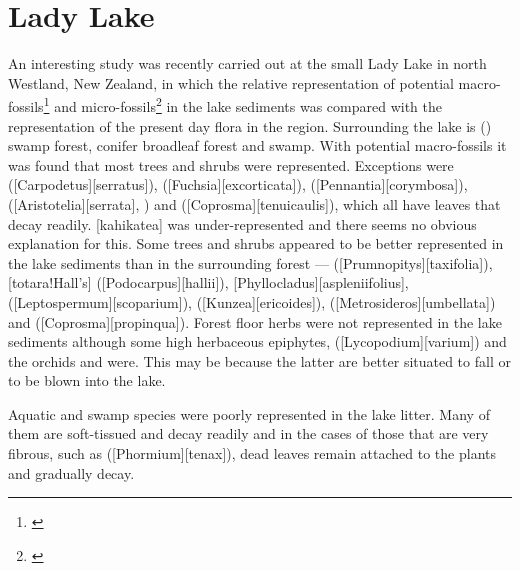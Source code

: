 \section{Lady Lake}

An interesting study was recently carried out at the small Lady Lake in north Westland, New Zealand, in which the relative representation of potential macro-fossils\footnote{\cite{drake1980influx}} and micro-fossils\footnote{\cite{pocknall1980modern}} in the lake sediments was compared with the representation of the present day flora in the region.
Surrounding the lake is  () swamp forest, conifer broadleaf forest and swamp.
With potential macro-fossils it was found that most trees and shrubs were represented.
Exceptions were  ([Carpodetus][serratus]),  ([Fuchsia][excorticata]),  ([Pennantia][corymbosa]),  ([Aristotelia][serrata], ) and  ([Coprosma][tenuicaulis]), which all have leaves that decay readily.
[kahikatea] was under-represented and there seems no obvious explanation for this.
Some trees and shrubs appeared to be better represented in the lake sediments than in the surrounding forest ---  ([Prumnopitys][taxifolia]), [totara!Hall's] ([Podocarpus][hallii]), [Phyllocladus][aspleniifolius],  ([Leptospermum][scoparium]),  ([Kunzea][ericoides]),  ([Metrosideros][umbellata]) and  ([Coprosma][propinqua]).
Forest floor herbs were not represented in the lake sediments although some high herbaceous epiphytes,  ([Lycopodium][varium]) and the orchids  and  were.
This may be because the latter are better situated to fall or to be blown into the lake.

Aquatic and swamp species were poorly represented in the lake litter.
Many of them are soft-tissued and decay readily and in the cases of those that are very fibrous, such as  ([Phormium][tenax]), dead leaves remain attached to the plants and gradually decay.

